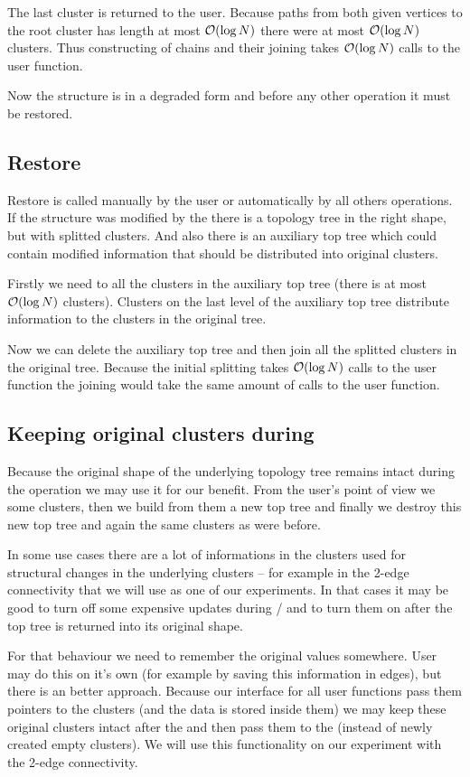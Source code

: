The last cluster is returned to the user. Because paths from both given vertices
to the root cluster has length at most ${\cal O}(\log N)$ there were at most ${\cal O}(\log
N)$ clusters. Thus constructing of chains and their joining takes ${\cal O}(\log N)$
calls to the \Join{} user function.

Now the structure is in a degraded form and before any other operation it must
be restored.

\subsection{Restore}

Restore is called manually by the user or automatically by all others
operations. If the structure was modified by the \Expose{} there is a topology
tree in the right shape, but with splitted clusters. And also there is an
auxiliary top tree which could contain modified information that should be
distributed into original clusters.

Firstly we need to \Split{} all the clusters in the auxiliary top tree (there
is at most ${\cal O}(\log N)$ clusters). Clusters on the last level of the auxiliary
top tree distribute information to the clusters in the original tree.

Now we can delete the auxiliary top tree and then join all the splitted clusters
in the original tree. Because the initial splitting takes ${\cal O}(\log N)$ calls to
the \Split{} user function the joining would take the same amount of calls to
the \Join{} user function.

\subsection{Keeping original clusters during \Expose}

Because the original shape of the underlying topology tree remains intact during
the \Expose{} operation we may use it for our benefit. From the user's point of
view we \Split{} some clusters, then we build from them a new top tree and
finally we destroy this new top tree and \Join{} again the same clusters as were
before.

In some use cases there are a lot of informations in the clusters used for
structural changes in the underlying clusters -- for example in the 2-edge
connectivity that we will use as one of our experiments. In that cases it may be
good to turn off some expensive updates during \Join/\Split{} and to turn them
on after the top tree is returned into its original shape.

For that behaviour we need to remember the original values somewhere. User may do this
on it's own (for example by saving this information in edges), but there is an
better approach. Because our interface for all user functions pass them pointers
to the clusters (and the data is stored inside them) we may keep these original
clusters intact after the \Split{} and then pass them to the \Join{} (instead of
newly created empty clusters). We will use this functionality on our experiment
with the 2-edge connectivity.
